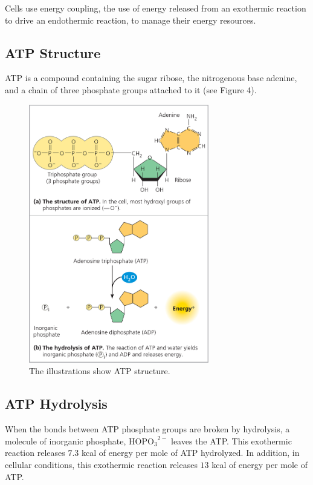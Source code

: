 \documentclass[a4paper]{article}
\begin{document}
Cells use \color{red}energy coupling\color{black}, the use of energy released from an exothermic reaction to drive an endothermic reaction, to manage their energy resources.\\

\subsection{ATP Structure}
\color{red}ATP \color{black} is a compound containing the sugar ribose, the nitrogenous base adenine, and a chain of three phosphate groups attached to it (see Figure 4).

\begin{figure}[h!]
\centering
\includegraphics[width=0.7\textwidth]{figure_four.jpeg}
\caption{The illustrations show ATP structure.}
\end{figure}

\subsection{ATP Hydrolysis}
When the bonds between ATP phosphate groups are broken by hydrolysis, a molecule of inorganic phosphate, ${\text{HOPO}_3}^{2-}$ leaves the ATP. This exothermic reaction releases $7.3$ kcal of energy per mole of ATP hydrolyzed. In addition, in cellular conditions, this exothermic reaction releases $13$ kcal of energy per mole of ATP.\\
\end{document}
